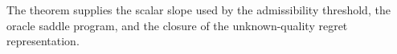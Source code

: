 The theorem supplies the scalar slope used by the admissibility threshold, the oracle saddle program, and the closure of the unknown-quality regret representation.